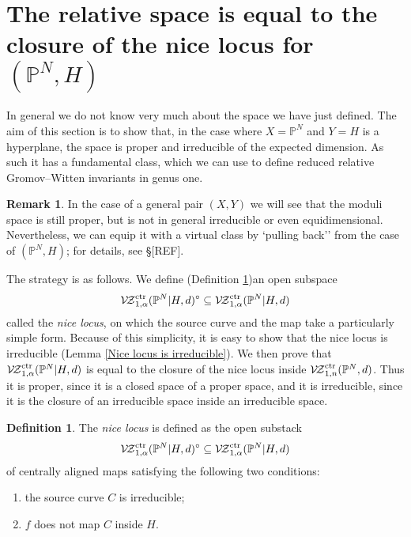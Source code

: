\documentclass[11pt]{amsart}
\newcommand{\PP}{\mathbb P}
\newcommand{\VZc}{{\mathcal{V\!Z}}^{\rm{ctr}}_{1,n}}
\newcommand{\VZcrel}{{\mathcal{V\!Z}}^{\rm{ctr}}_{1,\alpha}}
\theoremstyle{definition}
\theoremstyle{definition}
\newtheorem{definition}[thm]{Definition}
\newtheorem{remark}[thm]{Remark}
\begin{document}
\section{The relative space is equal to the closure of the nice locus for $(\PP^N,H)$}
\noindent In general we do not know very much about the space we have just defined. The aim of this section is to show that, in the case where $X=\PP^N$ and $Y=H$ is a hyperplane, the space is proper and irreducible of the expected dimension. As such it has a fundamental class, which we can use to define reduced relative Gromov--Witten invariants in genus one.

\begin{remark} In the case of a general pair $(X,Y)$ we will see that the moduli space is still proper, but is not in general irreducible or even equidimensional. Nevertheless, we can equip it with a virtual class by `pulling back'' from the case of $(\PP^N,H)$; for details, see \S [REF]. \end{remark}

The strategy is as follows. We define (Definition \ref{Definition of nice locus})an open subspace
\begin{equation*}\VZcrel(\PP^N|H,d)^{\circ} \subseteq \VZcrel(\PP^N|H,d)\end{equation*}
called the \emph{nice locus}, on which the source curve and the map take a particularly simple form. Because of this simplicity, it is easy to show that the nice locus is irreducible (Lemma \ref{Nice locus is irreducible}). We then prove that $\VZcrel(\PP^N|H,d)$ is equal to the closure of the nice locus inside $\VZc(\PP^N,d)$. Thus it is proper, since it is a closed space of a proper space, and it is irreducible, since it is the closure of an irreducible space inside an irreducible space.

\begin{definition} \label{Definition of nice locus} The \emph{nice locus} is defined as the open substack
\begin{equation*}\VZcrel(\PP^N|H,d)^{\circ} \subseteq \VZcrel(\PP^N|H,d)\end{equation*}
of centrally aligned maps satisfying the following two conditions:
\begin{enumerate}
\item the source curve $C$ is irreducible;
\item $f$ does not map $C$ inside $H$.
\end{enumerate}
\end{definition}
\end{document}
